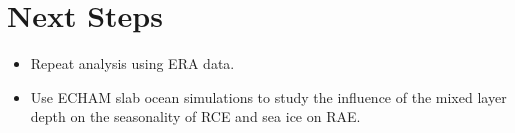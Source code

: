 \documentclass[11pt]{article}
\begin{document}
\section{Next Steps}
\label{sec:org3d879d9}
\begin{itemize}
\item Repeat analysis using ERA data.
\item Use ECHAM slab ocean simulations to study the influence of the mixed layer depth on the seasonality of RCE and sea ice on RAE.
\end{itemize}



\end{document}
